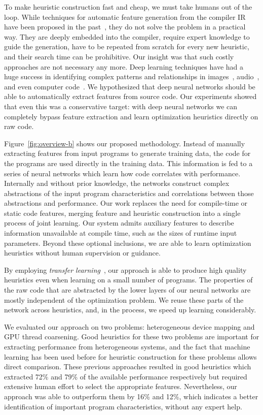 To make heuristic construction fast and cheap, we must take humans out of the loop. While techniques for automatic feature generation from the compiler IR have been proposed in the past~\cite{Namolaru2010a,Leather2014}, they do not solve the problem in a practical way. They are deeply embedded into the compiler, require expert knowledge to guide the generation, have to be repeated from scratch for every new heuristic, and their search time can be prohibitive. Our insight was that such costly approaches are not necessary any more. Deep learning techniques have had a huge success in identifying complex patterns and relationships in images~\cite{Krizhevsky2012,He2016}, audio~\cite{Lee2009b}, and even computer code~\cite{Allamanis2014,Allamanis2014a,Cummins2017a}. We hypothesized that deep neural networks should be able to automatically extract features from source code. Our experiments showed that even this was a conservative target: with deep neural networks we can completely bypass feature extraction and learn optimization heuristics directly on raw code.



Figure~\ref{fig:overview-b} shows our proposed methodology. Instead of manually extracting features from input programs to generate training data, the code for the programs are used directly in the training data. This information is fed to a series of neural networks which learn how code correlates with performance. Internally and without prior knowledge, the networks construct complex abstractions of the input program characteristics and correlations between those abstractions and performance. Our work replaces the need for compile-time or static code features, merging feature and heuristic construction into a single process of joint learning. Our system admits auxiliary features to describe information unavailable at compile time, such as the sizes of runtime input parameters.  Beyond these optional inclusions, we are able to learn optimization heuristics without human supervision or guidance.

By employing \emph{transfer learning}~\cite{Yosinski2014}, our approach is able to produce high quality heuristics even when learning on a small number of programs. The properties of the raw code that are abstracted by the lower layers of our neural networks are mostly independent of the optimization problem. We reuse these parts of the network across heuristics, and, in the process, we speed up learning considerably.

We evaluated our approach on two problems: heterogeneous device mapping and GPU thread coarsening. Good heuristics for these two problems are important for extracting performance from heterogeneous systems, and the fact that machine learning has been used before for heuristic construction for these problems allows direct comparison. These previous approaches resulted in good heuristics which extracted 72\% and 79\% of the available performance respectively but required extensive human effort to select the appropriate features. Nevertheless, our approach was able to outperform them by 16\% and 12\%, which indicates a better identification of important program characteristics, without any expert help.


